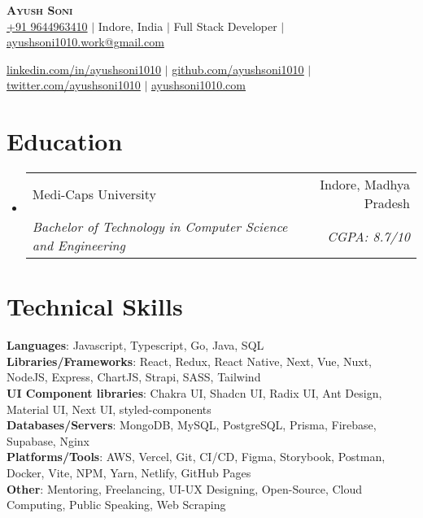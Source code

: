 \documentclass[letterpaper,11pt]{article}
\makeatletter
\newcommand{\resumeSubheading}[4]{
    \vspace{-2pt}\item
      \begin{tabular*}{0.97\textwidth}[t]{l@{\extracolsep{\fill}}r}
        {#1} & #2 \\
        \textit{\small#3} & \textit{\small #4} \\
      \end{tabular*}\vspace{-7pt}
  }
\newcommand{\resumeSubHeadingListStart}{\begin{itemize}[leftmargin=0.15in, label={}]}
\newcommand{\resumeSubHeadingListEnd}{\end{itemize}}
\makeatother
\begin{document}

\begin{center}
  \textbf{\Huge \scshape Ayush Soni} \\ \vspace{1pt}
  \href{tel:9644963410}{+91 9644963410} $|$
  {Indore, India} $|$
  {Full Stack Developer} $|$
  \href{mailto:ayushsoni1010.work@gmail.com}{ayushsoni1010.work@gmail.com} \\ \vspace{1pt}

  \href{https://linkedin.com/in/ayushsoni1010}{\underline{linkedin.com/in/ayushsoni1010}} $|$
  \href{https://github.com/ayushsoni1010}{\underline{github.com/ayushsoni1010}} $|$
  \href{https://twitter.com/ayushsoni1010}{\underline{twitter.com/ayushsoni1010}} $|$
  \href{https://ayushsoni1010.com}{\underline{ayushsoni1010.com}}
\end{center}

\section{Education}
\resumeSubHeadingListStart
\resumeSubheading
{Medi-Caps University}{Indore, Madhya Pradesh}
{Bachelor of Technology in Computer Science and Engineering}{CGPA: 8.7/10}
\resumeSubHeadingListEnd


\section{Technical Skills}
\begin{itemize}[leftmargin=0.15in, label={}]
  \small{\item{
        \textbf{Languages}{: Javascript, Typescript, Go, Java, SQL } \\
        \vspace{1pt}\textbf{Libraries/Frameworks}{: React, Redux, React Native, Next, Vue, Nuxt, NodeJS, Express, ChartJS, Strapi, SASS, Tailwind} \\
        \vspace{1pt}\textbf{UI Component libraries}{: Chakra UI, Shadcn UI, Radix UI, Ant Design, Material UI, Next UI, styled-components} \\
        \vspace{1pt}\textbf{Databases/Servers}{: MongoDB, MySQL, PostgreSQL, Prisma, Firebase, Supabase, Nginx} \\
        \vspace{1pt}\textbf{Platforms/Tools}{: AWS, Vercel, Git, CI/CD, Figma, Storybook, Postman, Docker, Vite, NPM, Yarn, Netlify, GitHub Pages } 
        \\
        \vspace{1pt}\textbf{Other}{: Mentoring, Freelancing, UI-UX Designing, Open-Source, Cloud Computing, Public Speaking, Web Scraping }
        }}
\end{itemize}
\end{document}

